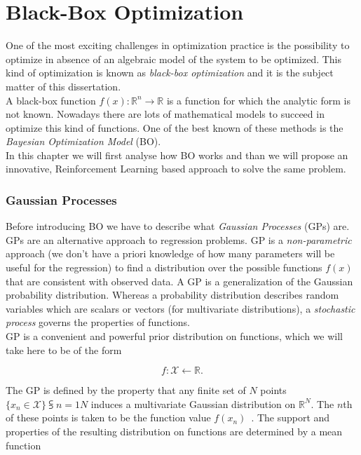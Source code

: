 \chapter{Black-Box Optimization}

One of the most exciting challenges in optimization practice is the possibility to optimize in absence of an algebraic model of the system to be optimized. This kind of optimization is known as \textit{black-box optimization} and it is the subject matter of this dissertation. \\

A black-box function $f(x) : \mathbb{R}^n \rightarrow \mathbb{R}$ is a function for which the analytic form is not known. Nowadays there are lots of mathematical models to succeed in optimize this kind of functions. One of the best known of these methods is the \textit{Bayesian Optimization Model} (BO). \\

In this chapter we will first analyse how BO works and than we will propose an innovative, Reinforcement Learning based approach to solve the same problem.

\subsection{Gaussian Processes} Before introducing BO we have to describe what \textit{Gaussian Processes} (GPs) are. GPs are an alternative approach to regression problems. GP is a \textit{non-parametric} approach (we don't have a priori knowledge of how many parameters will be useful for the regression) to find a distribution over the possible functions $f(x)$ that are consistent with observed data. A GP is a generalization of the Gaussian probability distribution. Whereas a probability distribution describes random variables which are scalars or vectors (for multivariate distributions), a \textit{stochastic process} governs the properties of functions. \\

GP is a convenient and powerful prior distribution on functions, which we will take here to be of the form 

\begin{equation}
	f : \mathcal{X} \leftarrow \mathbb{R}.
\end{equation}

The GP is defined by the property that any finite set of $N$ points $\{x_n \in \mathcal{X}\}\subsup{}{ n=1}{N}$ induces a multivariate Gaussian distribution  on $\mathbb{R}^N$. The $n$th of these points is taken to be the function value $f(x_n)$~\cite{NIPS2012_4522}. The support and properties of the resulting distribution on functions are determined by a mean function 

